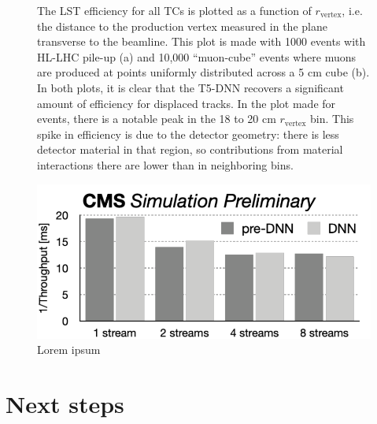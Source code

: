 \begin{figure}[!htb]
    \centering
    \qquad
    \caption{
        The LST efficiency for all TCs is plotted as a function of $r_\text{vertex}$, i.e. the distance to the production vertex measured in the plane transverse to the beamline.
        This plot is made with 1000 \ttbar events with HL-LHC pile-up (a) and 10,000 ``muon-cube'' events where muons are produced at points uniformly distributed across a 5 cm cube (b).
        In both plots, it is clear that the T5-DNN recovers a significant amount of efficiency for displaced tracks.
        In the plot made for \ttbar events, there is a notable peak in the 18 to 20 cm $r_\text{vertex}$ bin.
        This spike in efficiency is due to the detector geometry: there is less detector material in that region, so contributions from material interactions there are lower than in neighboring bins.
    }
\end{figure}

\begin{figure}[!htb]
    \centering
    \includegraphics[width=0.85\linewidth]{fig/lst/throughput_vs_streams.pdf}
    \caption{
        Lorem ipsum}
    \label{fig:streams-vs-throughput}
\end{figure}

\section{Next steps}
